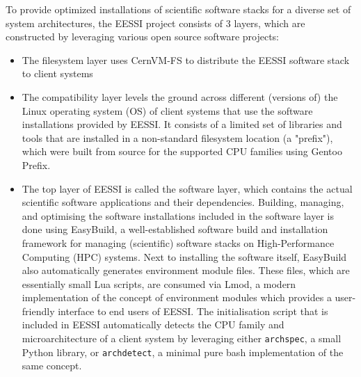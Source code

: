 To provide optimized installations of scientific software stacks for a diverse set of system architectures, the EESSI
project consists of 3 layers, which are constructed by leveraging various open source software projects:
\begin{itemize}
\item The filesystem layer uses CernVM-FS to distribute the EESSI software stack to client systems
\item The compatibility layer levels the ground across different (versions of) the Linux operating system (OS)
      of client systems that use the software installations provided by EESSI. It consists of a limited set of libraries
      and tools that are installed in a non-standard filesystem location (a "prefix"), which were built from source for
      the supported CPU families using Gentoo Prefix.
\item The top layer of EESSI is called the software layer, which contains the actual scientific software applications
      and their dependencies. Building, managing, and optimising the software installations included in the software
      layer is done using EasyBuild, a well-established software build and installation framework for managing
      (scientific) software stacks on High-Performance Computing (HPC) systems. Next to installing the software itself,
      EasyBuild also automatically generates environment module files. These files, which are essentially small Lua
      scripts, are consumed via Lmod, a modern implementation of the concept of environment modules which provides a
      user-friendly interface to end users of EESSI. The initialisation script that is included in EESSI
      automatically detects the CPU family and microarchitecture of a client system by leveraging either
      \texttt{archspec}, a small Python library, or \texttt{archdetect}, a minimal pure bash implementation of the same
      concept.
\end{itemize}


